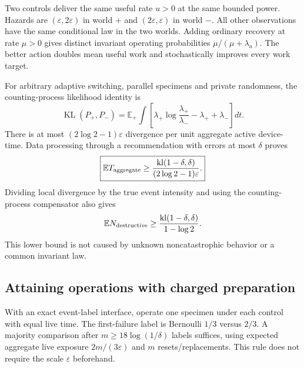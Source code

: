 \documentclass[10pt,a4paper]{article}
\newcommand{\E}{\mathbb E}\newcommand{\Pp}{\mathbb P}
\newcommand{\kl}{\operatorname{kl}}\newcommand{\KL}{\operatorname{KL}}
\begin{document}
Two controls deliver the same useful rate $u>0$ at the same bounded power. Hazards are $(\varepsilon,2\varepsilon)$ in world $+$ and $(2\varepsilon,\varepsilon)$ in world $-$. All other observations have the same conditional law in the two worlds. Adding ordinary recovery at rate $\mu>0$ gives distinct invariant operating probabilities $\mu/(\mu+\lambda_a)$. The better action doubles mean useful work and stochastically improves every work target.

For arbitrary adaptive switching, parallel specimens and private randomness, the counting-process likelihood identity is
\[
\KL(P_+,P_-)=
\E_+\int\left[\lambda_+\log\frac{\lambda_+}{\lambda_-}
-\lambda_++\lambda_-\right]dt.
\]
There is at most $(2\log2-1)\varepsilon$ divergence per unit aggregate active device-time. Data processing through a recommendation with errors at most $\delta$ proves
\begin{equation}
\boxed{\E T_{\rm aggregate}\ge
\frac{\kl(1-\delta,\delta)}{(2\log2-1)\varepsilon}.}
\label{eq:rarebound}
\end{equation}
Dividing local divergence by the true event intensity and using the counting-process compensator also gives
\[
\E N_{\rm destructive}\ge
\frac{\kl(1-\delta,\delta)}{1-\log2}.
\]
This lower bound is not caused by unknown noncatastrophic behavior or a common invariant law.

\subsection{Attaining operations with charged preparation}

With an exact event-label interface, operate one specimen under each control with equal live time. The first-failure label is Bernoulli $1/3$ versus $2/3$. A majority comparison after $m\ge18\log(1/\delta)$ labels suffices, using expected aggregate live exposure $2m/(3\varepsilon)$ and $m$ resets/replacements. This rule does not require the scale $\varepsilon$ beforehand.
\end{document}
